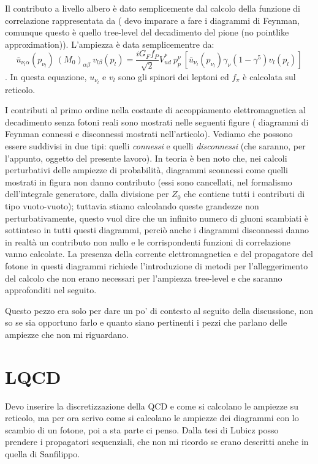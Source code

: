 \documentclass[LaM]{sapthesis}
\begin{document}
	Il contributo a livello albero è dato semplicemente dal calcolo della funzione di correlazione rappresentata da (\color{blue} devo imparare a fare i diagrammi di Feynman, comunque questo è quello tree-level del decadimento del pione (no pointlike approximation)\color{black}). L'ampiezza è data semplicementre da:
	\begin{equation}
		\bar{u}_{\nu_l  \alpha} (p_{\nu_l}) \ (M_0)_{\alpha\beta} \ v_{l  \beta}(p_l) = \frac{iG_Ff_P}{\sqrt{2}}V^*_{ud} \ p^\nu_p \ [\bar{u}_{\nu_l} (p_{\nu_l})\gamma_\nu(1-\gamma^5)v_l(p_l)]
	\end{equation}.
	In questa equazione, ${u}_{\nu_l}$ e $v_l$ sono gli spinori dei leptoni ed $f_\pi$ è calcolata sul reticolo.
	
	I contributi al primo ordine nella costante di accoppiamento elettromagnetica al decadimento senza fotoni reali sono mostrati nelle seguenti figure (\color{green} diagrammi di Feynman connessi e disconnessi mostrati nell'articolo\color{black}). Vediamo che possono essere suddivisi in due tipi: quelli \emph{connessi} e quelli \emph{disconnessi} (che saranno, per l'appunto, oggetto del presente lavoro). In teoria è ben noto che, nei calcoli perturbativi delle ampiezze di probabilità, diagrammi sconnessi come quelli mostrati in figura non danno contributo (essi sono cancellati, nel formalismo dell'integrale generatore, dalla divisione per $Z_0$ che contiene tutti i contributi di tipo vuoto-vuoto); tuttavia stiamo calcolando queste grandezze non perturbativamente, questo vuol dire che un infinito numero di gluoni scambiati è sottinteso in tutti questi diagrammi, perciò anche i diagrammi disconnessi danno in realtà un contributo non nullo e le corrispondenti funzioni di correlazione vanno calcolate. La presenza della corrente elettromagnetica e del propagatore del fotone in questi diagrammi richiede l'introduzione di metodi per l'alleggerimento del calcolo che non erano necessari per l'ampiezza tree-level e che saranno approfonditi nel seguito.
	
	\color{magenta} Questo pezzo era solo per dare un po' di contesto al seguito della discussione, non so se sia opportuno farlo e quanto siano pertinenti i pezzi che parlano delle ampiezze che non mi riguardano.\color{black}
	
	\chapter{LQCD}
	\color{blue} Devo inserire la discretizzazione della QCD e come si calcolano le ampiezze su reticolo, ma per ora scrivo come si calcolano le ampiezze dei diagrammi con lo scambio di un fotone, poi a sta parte ci penso. Dalla tesi di Lubicz posso prendere i propagatori sequenziali, che non mi ricordo se erano descritti anche in quella di Sanfilippo.\color{black}
\end{document}
